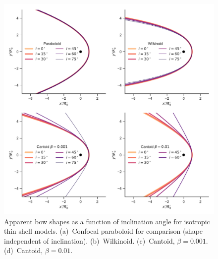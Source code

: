 





\begin{figure}
  \centering
  \includegraphics[width=0.8\linewidth]{figs/test_xyprime}
  \caption{Apparent bow shapes as a function of inclination angle for
    isotropic thin shell models. (a)~Confocal paraboloid for
    comparison (shape independent of inclination).
    (b)~Wilkinoid. (c)~Cantoid, \(\beta = 0.001\). (d)~Cantoid,
    \(\beta = 0.01\). }
  \label{fig:xyprime}
\end{figure}

